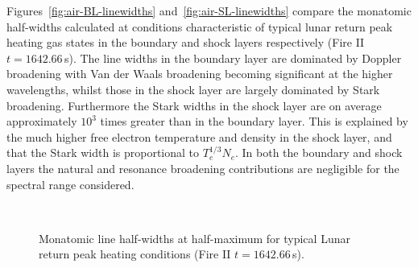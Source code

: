 Figures~\ref{fig:air-BL-linewidths} and~\ref{fig:air-SL-linewidths} compare the monatomic half-widths calculated at conditions characteristic of typical lunar return peak heating gas states in the boundary and shock layers respectively (Fire II $t=1642.66$\,s).
The line widths in the boundary layer are dominated by Doppler broadening with Van der Waals broadening becoming significant at the higher wavelengths, whilst those in the shock layer are largely dominated by Stark broadening.
Furthermore the Stark widths in the shock layer are on average approximately $10^3$ times greater than in the boundary layer.
This is explained by the much higher free electron temperature and density in the shock layer, and that the Stark width is proportional to $T_e^{1/3} N_e$.
In both the boundary and shock layers the natural and resonance broadening contributions are negligible for the spectral range considered.

\begin{figure}[p!]
 \center
  \\
 \caption{Monatomic line half-widths at half-maximum for typical Lunar return peak heating conditions (Fire II $t=1642.66$\,s).}
 \label{fig:air-linewidths}
\end{figure}


